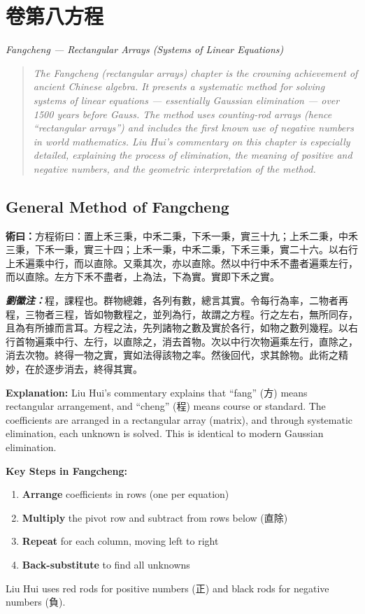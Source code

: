 \documentclass[11pt,a4paper]{article}
\newcommand{\volsubtitle}[1]{{\centering\Large\itshape\color{volcolor} #1\par\vspace{2em}}}
\newcommand{\shu}[1]{\textbf{術曰：}#1\par}
\newcommand{\liuhui}[1]{{\color{commentarycolor}\textit{\textbf{劉徽注：}}#1\par}}
\newcommand{\volheader}[2]{%
  \newpage
  \section*{#1\quad #2}
  \addcontentsline{toc}{section}{#1\quad #2}
  \markboth{#1\quad #2}{#1\quad #2}
  \vspace{1em}
}
\newenvironment{methodenv}{%
  \par\medskip\noindent\begingroup
  \setlength{\parskip}{0.5em}%
  \ignorespaces
}{%
  \par\endgroup\medskip
}
\begin{document}
\newpage
\volheader{卷第八}{方程}

\volsubtitle{Fangcheng --- Rectangular Arrays (Systems of Linear Equations)}

\begin{quote}
\color{quotecolor}
\textit{The Fangcheng (rectangular arrays) chapter is the crowning achievement of ancient Chinese algebra. It presents a systematic method for solving systems of linear equations --- essentially Gaussian elimination --- over 1500 years before Gauss. The method uses counting-rod arrays (hence ``rectangular arrays'') and includes the first known use of negative numbers in world mathematics. Liu Hui's commentary on this chapter is especially detailed, explaining the process of elimination, the meaning of positive and negative numbers, and the geometric interpretation of the method.}
\end{quote}

\subsection*{General Method of Fangcheng}

\shu{方程術曰：置上禾三秉，中禾二秉，下禾一秉，實三十九；上禾二秉，中禾三秉，下禾一秉，實三十四；上禾一秉，中禾二秉，下禾三秉，實二十六。以右行上禾遍乘中行，而以直除。又乘其次，亦以直除。然以中行中禾不盡者遍乘左行，而以直除。左方下禾不盡者，上為法，下為實。實即下禾之實。}

\liuhui{程，課程也。群物總雜，各列有數，總言其實。令每行為率，二物者再程，三物者三程，皆如物數程之，並列為行，故謂之方程。行之左右，無所同存，且為有所據而言耳。方程之法，先列諸物之數及實於各行，如物之數列幾程。以右行首物遍乘中行、左行，以直除之，消去首物。次以中行次物遍乘左行，直除之，消去次物。終得一物之實，實如法得該物之率。然後回代，求其餘物。此術之精妙，在於逐步消去，終得其實。}

\textbf{Explanation:} Liu Hui's commentary explains that ``fang'' (方) means rectangular arrangement, and ``cheng'' (程) means course or standard. The coefficients are arranged in a rectangular array (matrix), and through systematic elimination, each unknown is solved. This is identical to modern Gaussian elimination.

\begin{methodenv}
\textbf{Key Steps in Fangcheng:}
\begin{enumerate}
  \item \textbf{Arrange} coefficients in rows (one per equation)
  \item \textbf{Multiply} the pivot row and subtract from rows below (直除)
  \item \textbf{Repeat} for each column, moving left to right
  \item \textbf{Back-substitute} to find all unknowns
\end{enumerate}
Liu Hui uses red rods for positive numbers (正) and black rods for negative numbers (負).
\end{methodenv}
\end{document}
